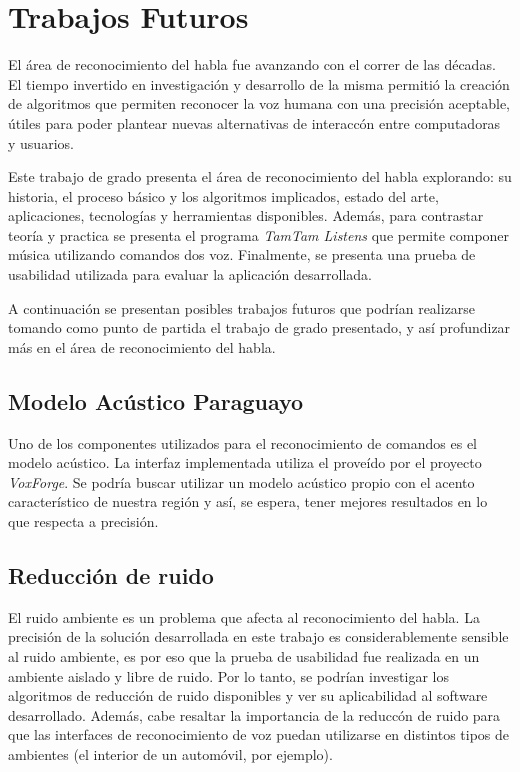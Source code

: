 \chapter{Trabajos Futuros}
\label{sec:trabajos-futuros}

El \'area de reconocimiento del habla fue avanzando con el correr de las d\'ecadas. El tiempo invertido
en investigaci\'on y desarrollo de la misma permiti\'o la creaci\'on de algoritmos que permiten
reconocer la voz humana con una precisi\'on aceptable, \'utiles para poder plantear nuevas alternativas
de interacc\'on entre computadoras y usuarios. 

Este trabajo de grado presenta el \'area de reconocimiento del habla explorando: su historia, el proceso
b\'asico y los algoritmos implicados, estado del arte, aplicaciones, tecnolog\'ias y herramientas disponibles.
Adem\'as, para contrastar teor\'ia y practica se presenta el programa \emph{TamTam Listens} que permite componer
m\'usica utilizando comandos dos voz. Finalmente, se presenta una prueba de usabilidad utilizada para evaluar la
aplicaci\'on desarrollada.

A continuaci\'on se presentan posibles trabajos futuros que podr\'ian realizarse tomando como punto de partida
el trabajo de grado presentado, y as\'i profundizar m\'as en el \'area de reconocimiento del habla.

\section{Modelo Ac\'ustico Paraguayo}

Uno de los componentes utilizados para el reconocimiento de comandos es el modelo ac\'ustico. La interfaz implementada
utiliza el prove\'ido por el proyecto \emph{VoxForge}. Se podr\'ia buscar utilizar un modelo ac\'ustico propio con el
acento caracter\'istico de nuestra regi\'on y as\'i, se espera, tener mejores resultados en lo que respecta a precisi\'on.

\section{Reducci\'on de ruido}

El ruido ambiente es un problema que afecta al reconocimiento del habla. La precisi\'on de la soluci\'on desarrollada en este trabajo es 
considerablemente sensible al ruido ambiente, es por eso que la prueba de usabilidad fue realizada en un ambiente aislado
y libre de ruido. Por lo tanto, se podr\'ian investigar los algoritmos de reducci\'on de ruido disponibles y ver su aplicabilidad
al software desarrollado. Adem\'as, cabe resaltar la importancia de la reducc\'on de ruido para que las interfaces de reconocimiento
de voz puedan utilizarse en distintos tipos de ambientes (el interior de un autom\'ovil, por ejemplo).

